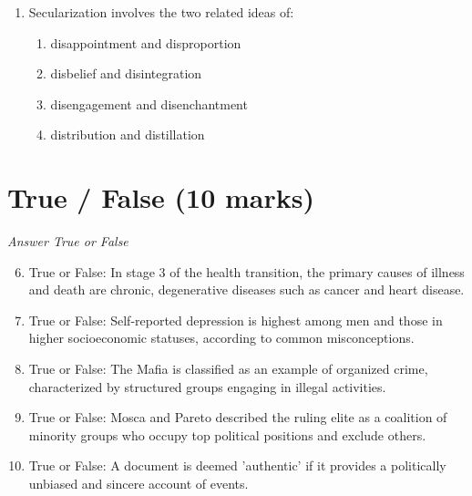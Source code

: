 \documentclass[12pt]{article}
\begin{document}
\begin{enumerate}[label=\arabic*.]
\begin{enumerate}[label=(\alph*)]
    \item a capitalist class dependent on property ownership and advantaged life chances
    \item an alignment of classes with shared interests but no state power
    \item a state elite whose members are drawn overwhelmingly from a power bloc
\end{enumerate}
\item Secularization involves the two related ideas of:
\begin{enumerate}[label=(\alph*)]
    \item disappointment and disproportion
    \item disbelief and disintegration
    \item disengagement and disenchantment
    \item distribution and distillation
\end{enumerate}
\end{enumerate}

\section*{True / False (10 marks)}
\textit{Answer True or False}
\begin{enumerate}[label=\arabic*.]
\setcounter{enumi}{5}
\item True or False: In stage 3 of the health transition, the primary causes of illness and death are chronic, degenerative diseases such as cancer and heart disease.
\item True or False: Self-reported depression is highest among men and those in higher socioeconomic statuses, according to common misconceptions.
\item True or False: The Mafia is classified as an example of organized crime, characterized by structured groups engaging in illegal activities.
\item True or False: Mosca and Pareto described the ruling elite as a coalition of minority groups who occupy top political positions and exclude others.
\item True or False: A document is deemed 'authentic' if it provides a politically unbiased and sincere account of events.
\end{enumerate}
\end{document}
